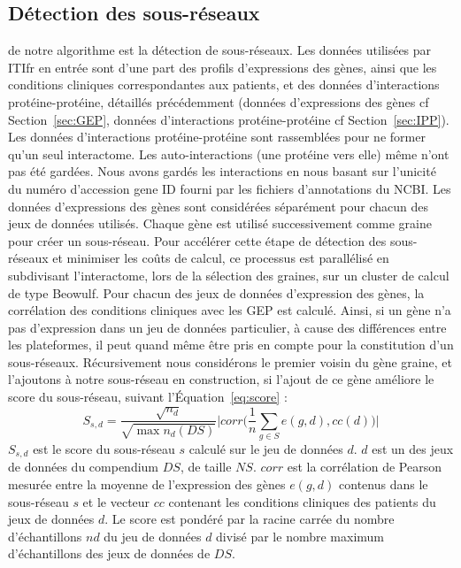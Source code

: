		\subsection{\textcolor{green!45!black}{Détection des sous-réseaux}}\label{sub:détection}
			 de notre algorithme est la détection de sous-réseaux.
			Les données utilisées par \acs{ITIfr} en entrée sont d'une part des profils d'expressions des gènes, ainsi que les conditions cliniques correspondantes aux patients, et des données d'interactions protéine-protéine, détaillés précédemment (données d'expressions des gènes cf Section~\ref{sec:GEP}, données d'interactions protéine-protéine cf Section~\ref{sec:IPP}).
			Les données d'interactions protéine-protéine sont rassemblées pour ne former qu'un seul interactome.
			Les auto-interactions (une protéine vers elle) même n'ont pas été gardées.
			Nous avons gardés les interactions en nous basant sur l'unicité du numéro d'accession gene ID fourni par les fichiers d'annotations du NCBI. 
			Les données d'expressions des gènes sont considérées séparément pour chacun des jeux de données utilisés.
			Chaque gène est utilisé successivement comme graine pour créer un sous-réseau.
			Pour accélérer cette étape de détection des sous-réseaux et minimiser les coûts de calcul, ce processus est parallélisé en subdivisant l'interactome, lors de la sélection des graines, sur un cluster de calcul de type Beowulf.
			Pour chacun des jeux de données d'expression des gènes, la corrélation des conditions cliniques avec les \acs{GEP} est calculé.
			Ainsi, si un gène n'a pas d'expression dans un jeu de données particulier, à cause des différences entre les plateformes, il peut quand même être pris en compte pour la constitution d'un sous-réseaux.
			Récursivement nous considérons le premier voisin du gène graine, et l'ajoutons à notre sous-réseau en construction, si l'ajout de ce gène améliore le score du sous-réseau, suivant l'Équation~\ref{eq:score} :
				\begin{equation}\label{eq:score}
					S_{s,d}=\frac{\sqrt{n_{d}}}{\sqrt{\max n_{d}(DS)}}\Bigg|corr\Bigg(\frac{1}{n}\sum_{g\in S}e(g,d),cc(d)\Bigg)\Bigg|
				\end{equation}
			$S_{s,d}$ est le score du sous-réseau $s$ calculé sur le jeu de données $d$.
			$d$ est un des jeux de données du compendium $DS$, de taille $NS$.
			$corr$ est la corrélation de Pearson mesurée entre la moyenne de l'expression des gènes $e(g,d)$ contenus dans le sous-réseau $s$ et le vecteur $cc$ contenant les conditions cliniques des patients du jeux de données $d$.
			Le score est pondéré par la racine carrée du nombre d'échantillons $nd$ du jeu de données $d$ divisé par le nombre maximum d'échantillons des jeux de données de $DS$.
	
